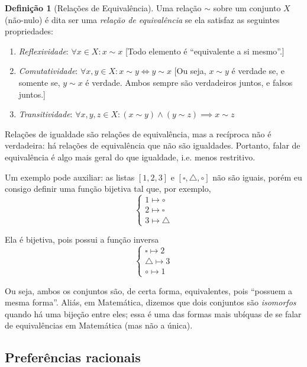 \documentclass[12pt]{article}
\numberwithin{equation}{section}
\theoremstyle{plain}
\theoremstyle{definition}
\newtheorem{definition}[theorem]{Definição}
\theoremstyle{remark}
\begin{document}
\begin{definition}[Relações de Equivalência]
  Uma relação $\sim$ sobre um conjunto $X$ (não-nulo) é dita ser uma \textit{relação de equivalência} se ela satisfaz as seguintes propriedades:
  \begin{enumerate}
      \item \emph{Reflexividade}: \(\forall x \in X: x \sim x\) [Todo elemento é ``equivalente a si mesmo''.] 
      \item \emph{Comutatividade}: \(\forall x, y \in X: x \sim y \iff y \sim x\) [Ou seja, $x \sim y$ é verdade se, e somente se, $y \sim x$ é verdade. Ambos sempre são verdadeiros juntos, e falsos juntos.]
      \item \emph{Transitividade}: \(\forall x, y, z \in X: (x \sim y) \land (y \sim z) \implies x \sim z\)
    \end{enumerate}
  
  Relações de igualdade são relações de equivalência, mas a recíproca não é verdadeira: há relações de equivalência que não são igualdades. Portanto, falar de equivalência é algo mais geral do que igualdade, i.e. menos restritivo. 

  Um exemplo pode auxiliar: as listas $[1, 2, 3]$ e $[\square, \triangle, \circ]$ não são iguais, porém eu consigo definir uma função bijetiva tal que, por exemplo,
  \[
  \begin{cases}
    1 \mapsto  \circ \\
    2 \mapsto \square \\
    3 \mapsto \triangle
  \end{cases}
  \]
  
  Ela é bijetiva, pois possui a função inversa
  \[
  \begin{cases}
    \square \mapsto  2 \\
    \triangle \mapsto 3 \\
    \circ \mapsto 1
  \end{cases}
  \]
  
  Ou seja, ambos os conjuntos são, de certa forma, equivalentes, pois ``possuem a mesma forma''. Aliás, em Matemática, dizemos que dois conjuntos são \textit{isomorfos} quando há uma bijeção entre eles; essa é uma das formas mais ubíquas de se falar de equivalências em Matemática (mas não a única).

\end{definition}


\hypertarget{preferuxeancias-racionais}{%
\subsection{Preferências racionais}\label{preferuxeancias-racionais}}
\end{document}
